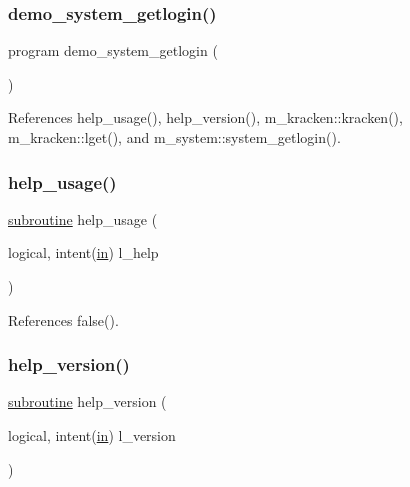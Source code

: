 \subsubsection{\texorpdfstring{demo\+\_\+system\+\_\+getlogin()}{demo\_system\_getlogin()}}
{\footnotesize\ttfamily program demo\+\_\+system\+\_\+getlogin (\begin{DoxyParamCaption}{ }\end{DoxyParamCaption})}



References help\+\_\+usage(), help\+\_\+version(), m\+\_\+kracken\+::kracken(), m\+\_\+kracken\+::lget(), and m\+\_\+system\+::system\+\_\+getlogin().

\mbox{\label{__logname_8f90_a3e09a3b52ee8fb04eeb93fe5761626a8}} 
\subsubsection{\texorpdfstring{help\+\_\+usage()}{help\_usage()}}
{\footnotesize\ttfamily \hyperlink{M__stopwatch_83_8txt_acfbcff50169d691ff02d4a123ed70482}{subroutine} help\+\_\+usage (\begin{DoxyParamCaption}\item[{logical, intent(\hyperlink{M__journal_83_8txt_afce72651d1eed785a2132bee863b2f38}{in})}]{l\+\_\+help }\end{DoxyParamCaption})}



References false().

\mbox{\label{__logname_8f90_a39c21619b08a3c22f19e2306efd7f766}} 
\subsubsection{\texorpdfstring{help\+\_\+version()}{help\_version()}}
{\footnotesize\ttfamily \hyperlink{M__stopwatch_83_8txt_acfbcff50169d691ff02d4a123ed70482}{subroutine} help\+\_\+version (\begin{DoxyParamCaption}\item[{logical, intent(\hyperlink{M__journal_83_8txt_afce72651d1eed785a2132bee863b2f38}{in})}]{l\+\_\+version }\end{DoxyParamCaption})}



